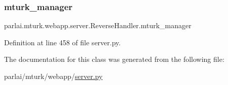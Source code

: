 \subsubsection{\texorpdfstring{mturk\+\_\+manager}{mturk\_manager}}
{\footnotesize\ttfamily parlai.\+mturk.\+webapp.\+server.\+Reverse\+Handler.\+mturk\+\_\+manager}



Definition at line 458 of file server.\+py.



The documentation for this class was generated from the following file\+:\begin{DoxyCompactItemize}
\item 
parlai/mturk/webapp/\hyperlink{server_8py}{server.\+py}\end{DoxyCompactItemize}
